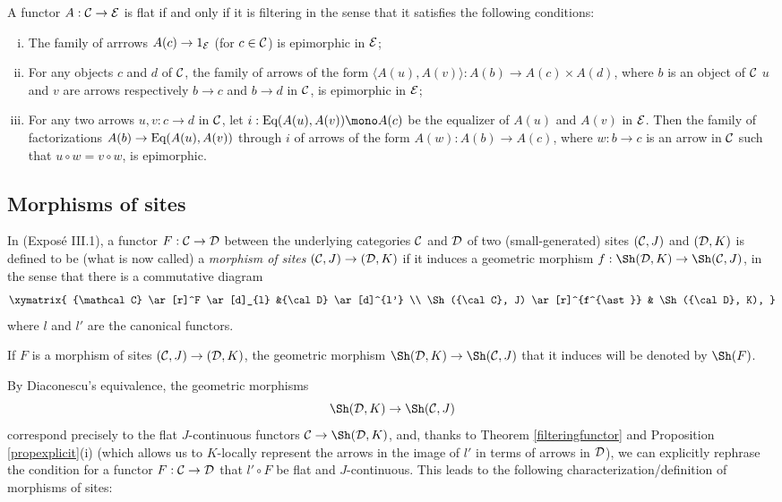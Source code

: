 \documentclass[a4paper,12pt]{article}
\begin{document}
\begin{theorem}\label{filteringfunctor}
	A functor $A:{\cal C}\to {\cal E}$ is flat if and only if it is filtering in the sense that it satisfies the following conditions:	
	\begin{enumerate}[(i)]
		\item The family of arrrows $A(c)\to 1_{\cal E}$ (for $c\in {\cal C}$) is epimorphic in $\cal E$;
		
		\item For any objects $c$ and $d$ of $\cal C$, the family of arrows of the form $\langle A(u), A(v)\rangle :A(b)\to A(c)\times A(d)$, where $b$ is an object of $\cal C$ $u$ and $v$ are arrows respectively $b\to c$ and $b\to d$ in $\cal C$, is epimorphic in $\cal E$;
		
		\item For any two arrows $u, v:c\to d$ in $\cal C$, let $i:\textup{Eq}(A(u), A(v))\mono A(c)$ be the equalizer of $A(u)$ and $A(v)$ in $\cal E$. Then the family of factorizations $A(b)\to \textup{Eq}(A(u), A(v))$ through $i$ of arrows of the form $A(w):A(b)\to A(c)$, where $w:b\to c$ is an arrow in $\cal C$ such that $u\circ w=v\circ w$, is epimorphic. 		
	\end{enumerate}
\end{theorem}

\subsection{Morphisms of sites}

In \cite{grothendieck} (Expos\'e III.1), a functor $F:{\cal C}\to {\cal D}$ between the underlying categories $\cal C$ and $\cal D$ of two (small-generated) sites $({\cal C}, J)$ and $({\cal D}, K)$ is defined to be (what is now called) a \emph{morphism of sites} $({\cal C}, J)\to ({\cal D}, K)$ if it induces a geometric morphism $f:\Sh({\cal D}, K)\to \Sh({\cal C}, J)$, in the sense that there is a commutative diagram 
	$$
\xymatrix{
	{\mathcal C} \ar[r]^F \ar[d]_{l} &{\cal D} \ar[d]^{l'} \\
	\Sh({\cal C}, J) \ar[r]^{f^{\ast}} & \Sh({\cal D}, K),
}
$$
where $l$ and $l'$ are the canonical functors. 

If $F$ is a morphism of sites  $({\cal C}, J)\to ({\cal D}, K)$, the geometric morphism $\Sh({\cal D}, K)\to \Sh({\cal C}, J)$ that it induces will be denoted by $\Sh(F)$.

By Diaconescu's equivalence, the geometric morphisms 
\[
\Sh({\cal D}, K)\to \Sh({\cal C}, J)
\]
correspond precisely to the flat $J$-continuous functors ${\cal C}\to \Sh({\cal D}, K)$, and, thanks to Theorem \ref{filteringfunctor} and Proposition \ref{propexplicit}(i) (which allows us to $K$-locally represent the arrows in the image of $l'$ in terms of arrows in $\cal D$), we can explicitly rephrase the condition for a functor $F:{\cal C}\to {\cal D}$ that $l'\circ F$ be flat and $J$-continuous. This leads to the following characterization/definition of morphisms of sites:
\end{document}
